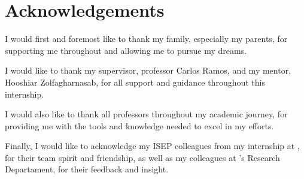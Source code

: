 
\section*{Acknowledgements}

\hspace{\parindent}I would first and foremost like to thank my family, especially my parents, for supporting me throughout and allowing me to pursue my dreams.

I would like to thank my supervisor, professor Carlos Ramos, and my mentor, Hooshiar Zolfagharnasab, for all support and guidance throughout this internship.

I would also like to thank all professors throughout my academic journey, for providing me with the tools and knowledge needed to excel in my efforts.

Finally, I would like to acknowledge my ISEP colleagues from my internship at \faro, for their team spirit and friendship, as well as my colleagues at \faro's Research Departament, for their feedback and insight.

